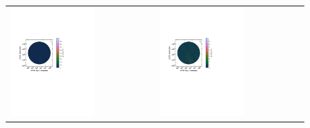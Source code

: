 \begin{figure}
\hspace{-2cm}\begin{tabular}{ll}
\includegraphics[clip, trim=0.1cm 11cm 6cm 6cm, width=0.6\textwidth]{chapters/polcal/figures/68380-I.pdf} &
\includegraphics[clip, trim=0.1cm 11cm 6cm 6cm, width=0.6\textwidth]{chapters/polcal/figures/68380-Q.pdf} \\

\end{tabular}
\end{figure}
